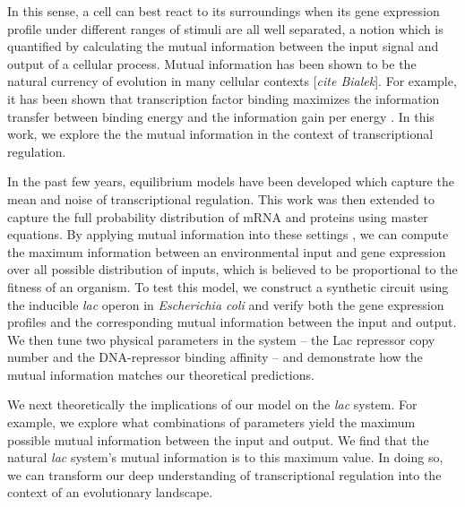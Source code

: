 In this sense, a cell can best react to its surroundings when its gene
expression profile under different ranges of stimuli are all well separated, a
notion which is quantified by calculating the mutual information between the
input signal and output of a cellular process. Mutual information has been shown
to be the natural currency of evolution in many cellular contexts [\textit{cite
	Bialek}]. For example, it has been shown that transcription factor binding
maximizes the information transfer between binding energy and the information
gain per energy \cite{Savir2016}. In this work, we explore the the mutual
information in the context of transcriptional regulation.

In the past few years, equilibrium models have been developed which capture the
mean \cite{Garcia2011c} and noise \cite{Jones2014a} of transcriptional
regulation. This work was then extended to capture the full probability
distribution of mRNA \cite{Sanchez2013} and proteins \cite{Shahrezaei2008, Swain2016} using
master equations. By applying mutual information into these settings
\cite{Tkacik2008a}, we can compute the maximum information between an
environmental input and gene expression over all possible distribution of
inputs, which is believed to be proportional to the fitness of an organism. To
test this model, we construct a synthetic circuit using the inducible
\textit{lac} operon in \textit{Escherichia coli} and verify both the gene
expression profiles and the corresponding mutual information between the input
and output. We then tune two physical parameters in the system -- the Lac
repressor copy number and the DNA-repressor binding affinity -- and demonstrate
how the mutual information matches our theoretical predictions.

We next theoretically the implications of our model on the \textit{lac} system.
For example, we explore what combinations of parameters yield the maximum
possible mutual information between the input and output. We find that the
natural \textit{lac} system's mutual information is  to this maximum value. In doing so, we can transform our deep
understanding of transcriptional regulation into the context of an evolutionary
landscape.



